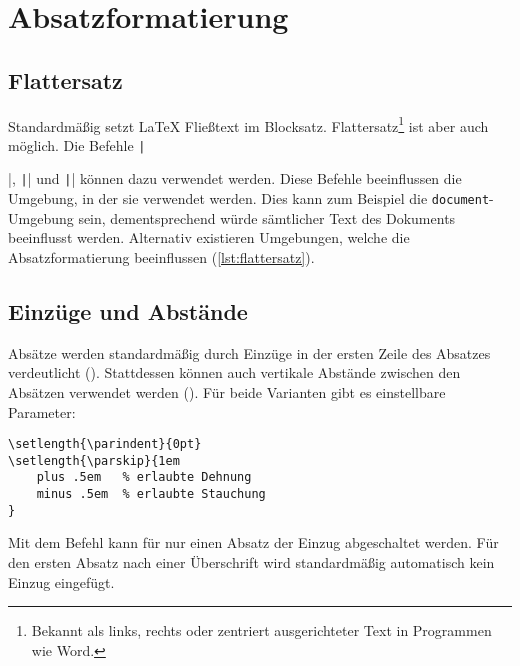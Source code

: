 \section{Absatzformatierung} %
\label{sec:absatzformatierung}

\subsection*{Flattersatz}
\label{sub:flattersatz}
Standardmäßig setzt \LaTeX{} Fließtext im Blocksatz. 
Flattersatz\footnote{Bekannt als links, rechts oder zentriert ausgerichteter Text in Programmen wie Word.} ist aber auch möglich. 
Die Befehle \texttt|\raggedright|, \texttt|\raggedleft| und \texttt|\centering| können dazu verwendet werden. 
Diese Befehle beeinflussen die Umgebung, in der sie verwendet werden. 
Dies kann zum Beispiel die \texttt{document}-Umgebung sein, dementsprechend würde sämtlicher Text des Dokuments beeinflusst werden.
Alternativ existieren Umgebungen, welche die Absatzformatierung beeinflussen (\cref{lst:flattersatz}).


\subsection*{Einzüge und Abstände}
\label{sub:einzüge_und_abstände}
Absätze werden standardmäßig durch Einzüge in der ersten Zeile des Absatzes verdeutlicht (\texttt{\parindent}). 
Stattdessen können auch vertikale Abstände zwischen den Absätzen verwendet werden (\texttt{\parskip}). 
Für beide Varianten gibt es einstellbare Parameter:
\begin{verbatim}
\setlength{\parindent}{0pt}
\setlength{\parskip}{1em
    plus .5em   % erlaubte Dehnung
    minus .5em  % erlaubte Stauchung
}
\end{verbatim}
Mit dem Befehl \texttt{\noindent} kann für nur einen Absatz der Einzug abgeschaltet werden. 
Für den ersten Absatz nach einer Überschrift wird standardmäßig automatisch kein Einzug eingefügt.

